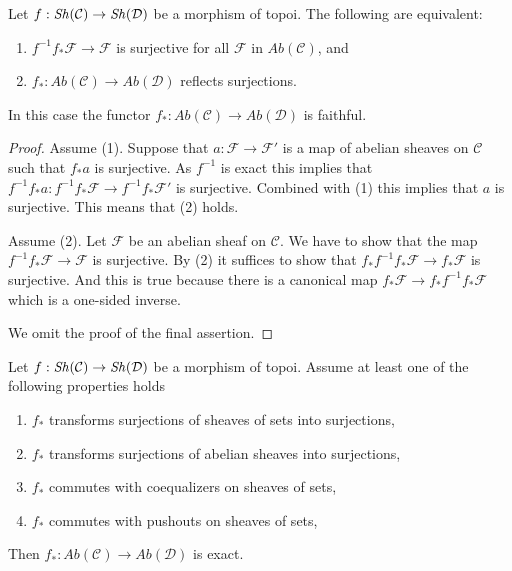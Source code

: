 \begin{lemma}
\label{lemma-reflect-surjections}
Let $f : \mathop{\mathit{Sh}}\nolimits(\mathcal{C}) \to \mathop{\mathit{Sh}}\nolimits(\mathcal{D})$ be
a morphism of topoi. The following are equivalent:
\begin{enumerate}
\item $f^{-1}f_*\mathcal{F} \to \mathcal{F}$ is surjective for
all $\mathcal{F}$ in $\textit{Ab}(\mathcal{C})$, and
\item $f_* : \textit{Ab}(\mathcal{C}) \to \textit{Ab}(\mathcal{D})$
reflects surjections.
\end{enumerate}
In this case the functor
$f_* : \textit{Ab}(\mathcal{C}) \to \textit{Ab}(\mathcal{D})$
is faithful.
\end{lemma}

\begin{proof}
Assume (1). Suppose that $a : \mathcal{F} \to \mathcal{F}'$
is a map of abelian sheaves on $\mathcal{C}$ such that $f_*a$ is surjective.
As $f^{-1}$ is exact this implies that
$f^{-1}f_*a : f^{-1}f_*\mathcal{F} \to f^{-1}f_*\mathcal{F}'$
is surjective. Combined with (1) this implies that $a$ is surjective.
This means that (2) holds.

\medskip\noindent
Assume (2). Let $\mathcal{F}$ be an abelian sheaf on $\mathcal{C}$.
We have to show that the map $f^{-1}f_*\mathcal{F} \to \mathcal{F}$ is
surjective. By (2) it suffices to show that
$f_*f^{-1}f_*\mathcal{F} \to f_*\mathcal{F}$ is surjective.
And this is true because there is a canonical map
$f_*\mathcal{F} \to f_*f^{-1}f_*\mathcal{F}$ which is a one-sided inverse.

\medskip\noindent
We omit the proof of the final assertion.
\end{proof}

\begin{lemma}
\label{lemma-exactness}
Let $f : \mathop{\mathit{Sh}}\nolimits(\mathcal{C}) \to \mathop{\mathit{Sh}}\nolimits(\mathcal{D})$ be
a morphism of topoi. Assume at least one of the following properties
holds
\begin{enumerate}
\item $f_*$ transforms surjections of sheaves of sets into surjections,
\item $f_*$ transforms surjections of abelian sheaves into surjections,
\item $f_*$ commutes with coequalizers on sheaves of sets,
\item $f_*$ commutes with pushouts on sheaves of sets,
\end{enumerate}
Then $f_* : \textit{Ab}(\mathcal{C}) \to \textit{Ab}(\mathcal{D})$
is exact.
\end{lemma}

